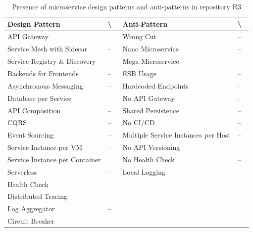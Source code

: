 \documentclass{Configuration_Files/PoliMi3i_thesis}
\newcommand{\cmark}{\ding{51}}%
\begin{document}
\begin{table}[H]
\centering 
    \begin{tabular}{ 
  | >{\centering\arraybackslash} m{16em} 
  | >{\centering\arraybackslash} m{2.2em} 
  | >{\centering\arraybackslash} m{16em} 
  | >{\centering\arraybackslash} m{2.2em} | }
    \hline
    \rowcolor{bluepoli!40}
    \textbf{Design Pattern} & \cmark \textbackslash – & \textbf{Anti-Pattern} & \cmark \textbackslash – \T\B \\
    \hline \hline
    API Gateway & \cmark & Wrong Cut & – \T\B\\
    \hline
    \rowcolor{bluepoli!10}
    Service Mesh with Sidecar & – & Nano Microservice & – \T\B \\
    \hline
    Service Registry \& Discovery & \cmark & Mega Microservice & – \T\B \\
    \hline
    \rowcolor{bluepoli!10}
    Backends for Frontends & – & ESB Usage & – \T\B \\
    \hline
    Asynchronous Messaging & – & Hardcoded Endpoints & – \T\B \\
    \hline
    \rowcolor{bluepoli!10}
    Database per Service & \cmark & No API Gateway & – \T\B \\
    \hline
    API Composition & – & Shared Persistence & – \T\B \\
    \hline
    \rowcolor{bluepoli!10}
    CQRS & – & No CI/CD & – \T\B \\
    \hline
    Event Sourcing & – & Multiple Service Instances per Host & – \T\B \\
    \hline
    \rowcolor{bluepoli!10}
    Service Instance per VM & – & No API Versioning & \cmark \T\B \\
    \hline
    Service Instance per Container & \cmark & No Health Check & – \T\B \\
    \hline
    \rowcolor{bluepoli!10}
    Serverless & – & Local Logging & \cmark \T\B \\
    \hline
    Health Check & \cmark &  & \T\B \\
    \hline
    \rowcolor{bluepoli!10}
    Distributed Tracing & \cmark & & \T\B \\
    \hline
    Log Aggregator & – &  & \T\B \\
    \hline
    \rowcolor{bluepoli!10}
    Circuit Breaker & \cmark &  & \T\B \\
    \hline
    \end{tabular}
    \\[10pt]
    \caption{Presence of microservice design patterns and anti-patterns in repository R3}
    \label{table:R3_result}
\end{table}
\end{document}
